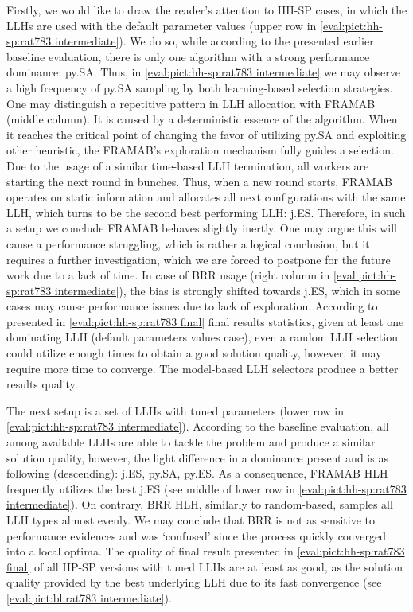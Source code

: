 Firstly, we would like to draw the reader's attention to HH-SP cases, in which the LLHs are used with the default parameter values (upper row in \cref{eval:pict:hh-sp:rat783 intermediate}). We do so, while according to the presented earlier baseline evaluation, there is only one algorithm with a strong performance dominance: py.SA. Thus, in \cref{eval:pict:hh-sp:rat783 intermediate} we may observe a high frequency of py.SA sampling by both learning-based selection strategies. One may distinguish a repetitive pattern in LLH allocation with FRAMAB (middle column). It is caused by a deterministic essence of the algorithm. When it reaches the critical point of changing the favor of utilizing py.SA and exploiting other heuristic, the FRAMAB's exploration mechanism fully guides a selection. Due to the usage of a similar time-based LLH termination, all workers are starting the next round in bunches. Thus, when a new round starts, FRAMAB operates on static information and allocates all next configurations with the same LLH, which turns to be the second best performing LLH: j.ES. Therefore, in such a setup we conclude FRAMAB behaves slightly inertly. One may argue this will cause a performance struggling, which is rather a logical conclusion, but it requires a further investigation, which we are forced to postpone for the future work due to a lack of time. In case of BRR usage (right column in \cref{eval:pict:hh-sp:rat783 intermediate}), the bias is strongly shifted towards j.ES, which in some cases may cause performance issues due to lack of exploration. According to presented in \cref{eval:pict:hh-sp:rat783 final} final results statistics, given at least one dominating LLH (default parameters values case), even a random LLH selection could utilize enough times to obtain a good solution quality, however, it may require more time to converge. The model-based LLH selectors produce a better results quality.

The next setup is a set of LLHs with tuned parameters (lower row in \cref{eval:pict:hh-sp:rat783 intermediate}). According to the baseline evaluation, all among available LLHs are able to tackle the problem and produce a similar solution quality, however, the light difference in a dominance present and is as following (descending): j.ES, py.SA, py.ES. As a consequence, FRAMAB HLH frequently utilizes the best j.ES (see middle of lower row in \cref{eval:pict:hh-sp:rat783 intermediate}). On contrary, BRR HLH, similarly to random-based, samples all LLH types almost evenly. We may conclude that BRR is not as sensitive to performance evidences and was `confused' since the process quickly converged into a local optima. The quality of final result presented in \cref{eval:pict:hh-sp:rat783 final} of all HP-SP versions with tuned LLHs are at least as good, as the solution quality provided by the best underlying LLH due to its fast convergence (see \cref{eval:pict:bl:rat783 intermediate}).

